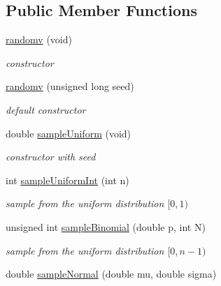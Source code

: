 \subsection*{Public Member Functions}
\begin{DoxyCompactItemize}
\item 
\mbox{\label{classrandomv_a32fc231d0bfb6a97c09d60fab19ed5fb}} 
\hyperlink{classrandomv_a32fc231d0bfb6a97c09d60fab19ed5fb}{randomv} (void)
\begin{DoxyCompactList}\small\item\em constructor \end{DoxyCompactList}\item 
\hyperlink{classrandomv_a82d37b6df4f44746c5858578c265cd96}{randomv} (unsigned long seed)
\begin{DoxyCompactList}\small\item\em default constructor \end{DoxyCompactList}\item 
double \hyperlink{classrandomv_a0d1def37be5addf36b11234e3a7b29d3}{sample\+Uniform} (void)
\begin{DoxyCompactList}\small\item\em constructor with seed \end{DoxyCompactList}\item 
\mbox{\label{classrandomv_a786b0ee6f4f4f4899326370a3112d4d8}} 
int \hyperlink{classrandomv_a786b0ee6f4f4f4899326370a3112d4d8}{sample\+Uniform\+Int} (int n)
\begin{DoxyCompactList}\small\item\em sample from the uniform distribution $[0,1)$ \end{DoxyCompactList}\item 
\mbox{\label{classrandomv_a7902b7016b5f9fb0b594e8575f8bf02a}} 
unsigned int \hyperlink{classrandomv_a7902b7016b5f9fb0b594e8575f8bf02a}{sample\+Binomial} (double p, int N)
\begin{DoxyCompactList}\small\item\em sample from the uniform distribution $[0,n-1)$ \end{DoxyCompactList}\item 
\mbox{\label{classrandomv_aa8c9c4b22b274a3cc1d4d05f99a88f50}} 
double \hyperlink{classrandomv_aa8c9c4b22b274a3cc1d4d05f99a88f50}{sample\+Normal} (double mu, double sigma)

\end{DoxyCompactItemize}
